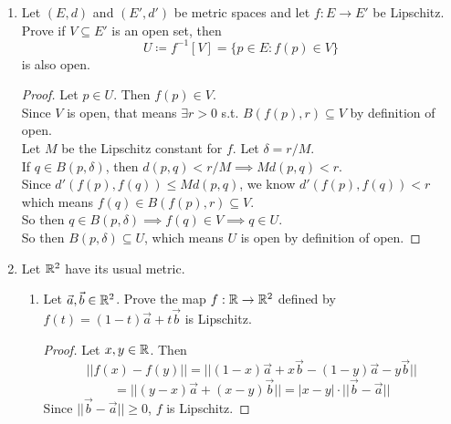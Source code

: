 \documentclass[14pt]{extarticle}
\begin{document}
\begin{enumerate}
\begin{enumerate}
			\item Prove that if $A$ and $B$ are both sequentially compact, then so is $E$.
			\begin{proof}
				Assume both $A$ and $B$ are seq. compact. Then every sequence in $A$ and $B$ will have a convergent subsequence.\\
				Let $\langle(a_n,b_n) \rangle_{n=1}^\infty$ be a sequence in $E$.\\
				So then $\langle a_n \rangle_{n=1}^\infty$ has a convergent subsequence $\langle a_{n_j} \rangle_{j=1}^\infty$.\\
				We can't say that $\langle b_{n_j} \rangle_{j=1}^\infty$ converges, but since $B$ is seq. compact, can say that there exists $\langle b_{n_{j_k}} \rangle_{k=1}^\infty$ that does converge.\\
				$\langle a_{n_{j_k}} \rangle_{k=1}^\infty$ is a subsequence of $\langle a_{n_j} \rangle_{j=1}^\infty$, which already converged. So $\langle a_{n_{j_k}} \rangle_{k=1}^\infty$ converges too.\\
				So then $\langle (a_{n_{j_k}},b_{n_{j_k}}) \rangle_{k=1}^\infty$ is a convergent subsequence of $\langle(a_n,b_n) \rangle_{n=1}^\infty$, proving $E$ is complete.
			\end{proof}
		\end{enumerate}
	
		\item Let $(E,d)$ and $(E',d')$ be metric spaces and let $f:E\rightarrow E'$ be Lipschitz. Prove if $V \subseteq E'$ is an open set, then \[U \coloneq f^{-1}[V] = \{p\in E : f(p) \in V\}\]
		is also open.
		\begin{proof}
			Let $p \in U$. Then $f(p) \in V$.\\
			Since $V$ is open, that means $\exists r>0$ s.t. $B(f(p),r) \subseteq V$ by definition of open.\\
			Let $M$ be the Lipschitz constant for $f$. Let $\delta = r/M$.\\
			If $q\in B(p,\delta)$, then $d(p,q)<r/M \implies Md(p,q)<r$.\\
			Since $d'(f(p),f(q))\leq Md(p,q)$, we know $d'(f(p),f(q))<r$ which means $f(q) \in B(f(p),r) \subseteq V$.\\
			So then $q \in B(p,\delta) \implies f(q) \in V \implies q \in U$.\\
			So then $B(p,\delta) \subseteq U$, which means $U$ is open by definition of open.
		\end{proof}
		
		\item Let $\mathbb{R}^2$ have its usual metric.
		\begin{enumerate}
			\item Let $\vec{a},\vec{b} \in \mathbb{R}^2$. Prove the map $f:\mathbb{R}\rightarrow\mathbb{R}^2$ defined by $f(t) = (1-t)\vec{a} + t\vec{b}$ is Lipschitz.
			\begin{proof}
				Let $x,y\in\mathbb{R}$. Then
				\[||f(x)-f(y)|| = ||(1-x)\vec{a}+x\vec{b}-(1-y)\vec{a}-y\vec{b}||\]
				\[= ||(y-x)\vec{a}+(x-y)\vec{b}|| = |x-y|\cdot||\vec{b}-\vec{a}||\]
				Since $||\vec{b}-\vec{a}||\geq0$, $f$ is Lipschitz.
			\end{proof}
			

\end{enumerate}
\end{enumerate}
\end{document}
